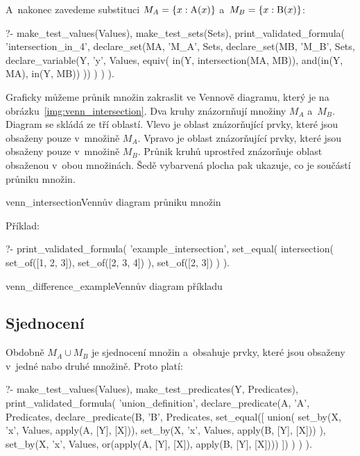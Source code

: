 A~nakonec zavedeme substituci \(M_A = \{x: \mathrm{A}(x)\}\) a~\(M_B = \{x: \mathrm{B}(x)\}\):
\begin{prolog}
?- 	make_test_values(Values),
	make_test_sets(Sets),
	print_validated_formula(
		'intersection_in_4',
		declare_set(MA, 'M_A', Sets,
			declare_set(MB, 'M_B', Sets,
				declare_variable(Y, 'y', Values, equiv(
					in(Y, intersection(MA, MB)),
					and(in(Y, MA), in(Y, MB))
				))
			)
		)
	).
\end{prolog}

Graficky můžeme průnik množin zakraslit ve Vennově diagramu, který je na obrázku~\ref{img:venn_intersection}. Dva kruhy znázornňují množiny \(M_A\) a~\(M_B\). Diagram se skládá ze tří oblastí. Vlevo je oblast znázorňující prvky, které jsou obsaženy pouze v~množině \(M_A\). Vpravo je oblast znázorňující prvky, které jsou obsaženy pouze v~množině \(M_B\). Průnik kruhů uprostřed znázorňuje oblast obsaženou v~obou množinách. Šedě vybarvená plocha pak ukazuje, co je součástí průniku množin.

\begin{fig}{venn_intersection}{Vennův diagram průniku množin}
\end{fig}

Příklad:

\begin{prolog}
?-	print_validated_formula(
		'example_intersection',
		set_equal(
			intersection(
				set_of([1, 2, 3]),
				set_of([2, 3, 4])
			),
			set_of([2, 3])
		)
	).
\end{prolog}

\begin{fig}{venn_difference_example}{Vennův diagram příkladu}
\end{fig}

\subsection{Sjednocení}

Obdobně \(M_A \cup M_B\) je sjednocení množin a~obsahuje prvky, které jsou obsaženy v~jedné nabo druhé množině. Proto platí:

\begin{prolog}
?- 	make_test_values(Values),
	make_test_predicates(Y, Predicates),
	print_validated_formula(
		'union_definition',
		declare_predicate(A, 'A', Predicates,
			declare_predicate(B, 'B', Predicates,
				set_equal([
					union(
						set_by(X, 'x', Values, apply(A, [Y], [X])),
						set_by(X, 'x', Values, apply(B, [Y], [X]))
					),
					set_by(X, 'x', Values, or(apply(A, [Y], [X]), apply(B, [Y], [X])))
				])
			)
		)
	).
\end{prolog}


